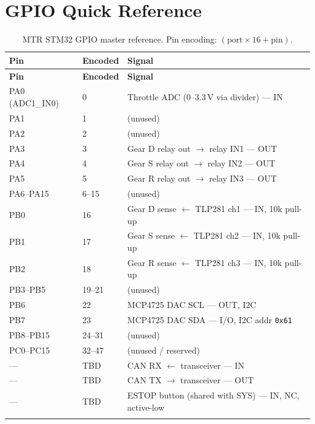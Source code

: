 \documentclass[12pt,a4paper,oneside]{report}
\newcommand{\iicaddr}[1]{\texttt{0x#1}}
\begin{document}
\section{GPIO Quick Reference}

\begin{center}
\begin{longtable}{lll}
\toprule
\textbf{Pin} & \textbf{Encoded} & \textbf{Signal} \\
\midrule
\endfirsthead
\toprule
\textbf{Pin} & \textbf{Encoded} & \textbf{Signal} \\
\midrule
\endhead
PA0 (ADC1\_IN0) & 0     & Throttle ADC (0--3.3\,V via divider) --- IN \\
PA1             & 1     & (unused) \\
PA2             & 2     & (unused) \\
PA3             & 3     & Gear D relay out $\rightarrow$ relay IN1 --- OUT \\
PA4             & 4     & Gear S relay out $\rightarrow$ relay IN2 --- OUT \\
PA5             & 5     & Gear R relay out $\rightarrow$ relay IN3 --- OUT \\
PA6--PA15       & 6--15 & (unused) \\
PB0             & 16    & Gear D sense $\leftarrow$ TLP281 ch1 --- IN, 10k pull-up \\
PB1             & 17    & Gear S sense $\leftarrow$ TLP281 ch2 --- IN, 10k pull-up \\
PB2             & 18    & Gear R sense $\leftarrow$ TLP281 ch3 --- IN, 10k pull-up \\
PB3--PB5        & 19--21 & (unused) \\
PB6             & 22    & MCP4725 DAC SCL --- OUT, I2C \\
PB7             & 23    & MCP4725 DAC SDA --- I/O, I2C addr \iicaddr{61} \\
PB8--PB15       & 24--31 & (unused) \\
PC0--PC15       & 32--47 & (unused / reserved) \\
---             & TBD    & CAN RX $\leftarrow$ transceiver --- IN \\
---             & TBD    & CAN TX $\rightarrow$ transceiver --- OUT \\
---             & TBD    & ESTOP button (shared with SYS) --- IN, NC, active-low \\
\bottomrule
\caption{MTR STM32 GPIO master reference. Pin encoding: $(\text{port} \times 16 + \text{pin})$.}
\end{longtable}
\end{center}
\end{document}

